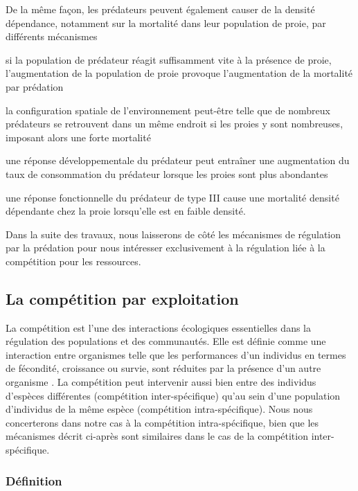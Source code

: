 De la même façon, les prédateurs peuvent également causer de la densité
dépendance, notamment sur la mortalité dans leur population de proie, par
différents mécanismes \autocites{taylor1984a} \begin{enumerate*}[label=(\roman*), before=\unskip{ : }, itemjoin={{ ; }},
itemjoin*={{ ; et }}] \item si la population de prédateur réagit suffisamment
vite à la présence de proie, l'augmentation de la population de proie provoque
l'augmentation de la mortalité par prédation
\item la configuration spatiale de l'environnement peut-être telle que de nombreux prédateurs se retrouvent dans un même endroit si
les proies y sont nombreuses, imposant alors une forte mortalité \item une
réponse développementale du prédateur peut entraîner une augmentation du taux de
consommation du prédateur lorsque les proies sont plus abondantes \item une
réponse fonctionnelle du prédateur de type III \autocites{holling1965a} cause une
mortalité densité dépendante chez la proie lorsqu'elle est en faible densité.
\end{enumerate*}

Dans la suite des travaux, nous laisserons de côté les mécanismes de régulation
par la prédation pour nous intéresser exclusivement à la régulation liée à la
compétition pour les ressources. 

\subsection{La compétition par exploitation}

La compétition est l'une des interactions écologiques essentielles dans la
régulation des populations et des communautés. Elle est définie comme une
interaction entre organismes telle que les performances d'un individus en termes
de fécondité, croissance ou survie, sont réduites par la présence d'un autre
organisme \autocites{volterra1931a, gause1932a, park1948a, park1954a, park1957a}.
La compétition peut intervenir aussi bien entre des individus d'espèces
différentes (compétition inter-spécifique) qu'au sein d'une population
d'individus de la même espèce (compétition intra-spécifique). Nous nous
concerterons dans notre cas à la compétition intra-spécifique, bien que les
mécanismes décrit ci-après sont similaires dans le cas de la compétition
inter-spécifique. 

\subsubsection{Définition}

